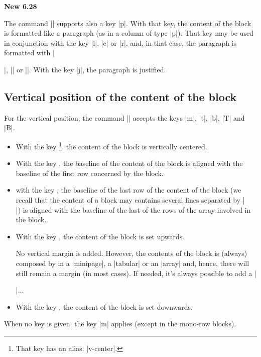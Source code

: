 \documentclass[dvipsnames]{article}%
\begin{document}
\bigskip
\colorbox{yellow!50}{\bfseries New 6.28}\par\nobreak

\smallskip
The command |\Block| supports also a key |p|. With that key, the content of the
block is formatted like a paragraph (as in a column of type |p|). That key may
be used in conjunction with the key |l|, |c| or |r|, and, in that case, the
paragraph is formatted with |\raggedright|, |\centering| or |\raggedleft|. With
the key |j|, the paragraph is justified.

\subsection{Vertical position of the content of the block}

\label{vertical-pos-block}

For the vertical position, the command |\Blocks| accepts the keys
|m|, |t|, |b|, |T| and |B|.


\begin{itemize}
\item {}
With the key \footnote{That key has an alias: |v-center|.}, the content of the block is vertically centered.
\item With the key , the baseline of the content of the block is aligned
with the baseline of the first row concerned by the block.
\item with the key , the baseline of the last row of the content of the
block (we recall that the content of a block may contains several lines
separated by |\\|) is aligned with the baseline of the last of the rows of the
array involved in the block.
\item With the key , the content of the block is set upwards. 

No vertical margin is added. However, the contents of the block is (always)
composed by  in a |{minipage}|, a |{tabular}| or an |{array}|
and, hence, there will still remain a margin (in most cases). If needed, it's
always possible to add a |\strut|...

\item With the key , the content of the block is set downwards.
\end{itemize}

When no key is given, the key |m| applies (except in the mono-row blocks).
\end{document}
